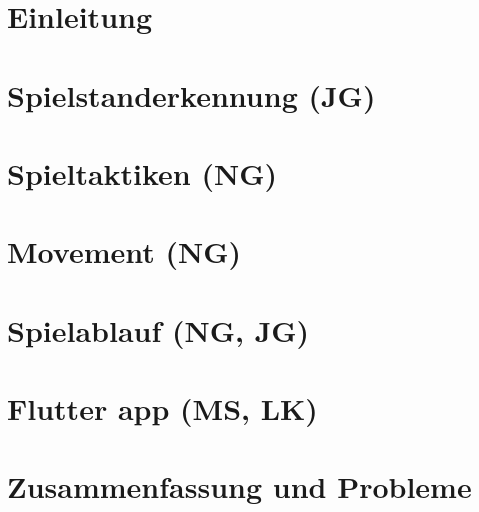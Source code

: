 \documentclass[12pt,a4paper,DIV13,pdftex,BCOR10mm,fleqn,liststotoc,bibtotoc,cleardoubleempty]{scrbook}
\begin{document}
\mainmatter
\chapter{Einleitung}

\newpage

\newpage
\chapter{Spielstanderkennung (JG)}
\newpage

\newpage

\newpage

\newpage
\chapter{Spieltaktiken (NG)}


\newpage
\chapter{Movement (NG)}

\newpage
\chapter{Spielablauf (NG, JG)}

\newpage
\chapter{Flutter app (MS, LK)}

\chapter{Zusammenfassung und Probleme}

\backmatter

\nocite{*}

\end{document}
